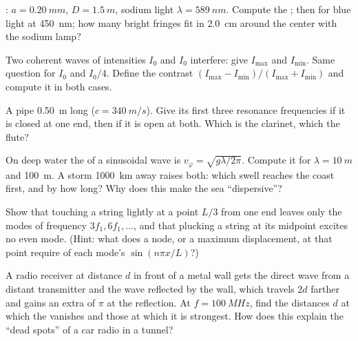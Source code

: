\begin{exercise}[$\star\star$]\label{exo:b1:wave-propagation:7}
: $a = \qty{0.20}{mm}$, $D = \qty{1.5}{m}$, sodium light
$\lambda = \qty{589}{nm}$. Compute the ; then for blue
light at \qty{450}{nm}; how many bright fringes fit in \qty{2.0}{cm}
around the center with the sodium lamp?
\end{exercise}

\begin{exercise}[$\star\star$]\label{exo:b1:wave-propagation:8}
Two coherent waves of intensities $I_0$ and $I_0$ interfere: give
$I_{\max}$ and $I_{\min}$. Same question for $I_0$ and $I_0/4$. Define
the contrast $(I_{\max} - I_{\min})/(I_{\max} + I_{\min})$ and compute it
in both cases.
\end{exercise}

\begin{exercise}[$\star\star$]\label{exo:b1:wave-propagation:9}
A pipe \qty{0.50}{m} long ($c = \qty{340}{m/s}$). Give its first three
resonance frequencies if it is closed at one end, then if it is open at
both. Which is the clarinet, which the flute?
\end{exercise}

\begin{exercise}[$\star\star\star$]\label{exo:b1:wave-propagation:10}
On deep water the  of a sinusoidal wave is
$v_\varphi = \sqrt{g\lambda/2\pi}$. Compute it for $\lambda = \qty{10}{m}$
and \qty{100}{m}. A storm \qty{1000}{km} away raises both: which swell
reaches the coast first, and by how long? Why does this make the sea
``dispersive''?
\end{exercise}

\begin{exercise}[$\star\star\star$]\label{exo:b1:wave-propagation:11}
Show that touching a string lightly at a point $L/3$ from one end
leaves only the modes of frequency $3f_1, 6f_1, \dots$, and that
plucking a string at its midpoint excites no even mode. (Hint: what
does a node, or a maximum displacement, at that point require of each
mode's $\sin(n\pi x/L)$?)
\end{exercise}

\begin{exercise}[$\star\star\star$]\label{exo:b1:wave-propagation:12}
A radio receiver at distance $d$ in front of a metal wall gets the
direct wave from a distant transmitter and the wave reflected by the
wall, which travels $2d$ farther and gains an extra  of $\pi$ at
the reflection. At $f = \qty{100}{MHz}$, find the distances $d$ at which
the  vanishes and those at which it is strongest. How does this
explain the ``dead spots'' of a car radio in a tunnel?
\end{exercise}

